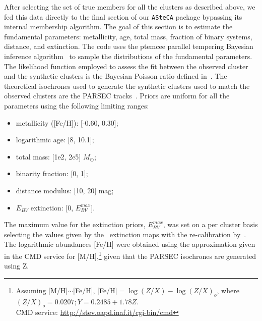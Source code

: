 \documentclass{aa}
\begin{document}
  After selecting the set of true members for all the clusters as described
  above, we fed this data directly to the final section of our 
  \texttt{ASteCA} package bypassing its internal membership algorithm. 
  The goal of this section is  to estimate
  the fundamental parameters: metallicity, age, total mass, fraction of binary
  systems, distance, and extinction. The code uses the ptemcee parallel
  tempering Bayesian inference algorithm~\citep{ptemcee} to sample the
  distributions of the fundamental parameters. The likelihood function employed
  to assess the fit between the observed cluster and the synthetic clusters is
  the Bayesian Poisson ratio defined in~\cite{Tremmel_2013}.
  The theoretical isochrones used to generate the
  synthetic clusters used to match the observed clusters are the PARSEC
  tracks~\citep{Bressan_2012}. Priors are uniform for all the parameters using
  the following limiting ranges: \begin{itemize}
   \item metallicity ([Fe/H]): [-0.60, 0.30];
   \item logarithmic age: [8, 10.1];
   \item total mass: [1e2, 2e5] $M_{\odot}$;
   \item binarity fraction: [0, 1];
   \item distance modulus: [10, 20] mag;
   \item $E_{BV}$ extinction: [0, $E_{BV}^{max}$].
  \end{itemize}

  \noindent The maximum value for the extinction priors, $E_{BV}^{max}$, was set
  on a per cluster basis selecting the values given by the~\cite{Schlegel_1998}
  extinction maps with the re-calibration by~\cite{Schlafly_2011}.
  The logarithmic abundances [Fe/H] were obtained using the approximation given
  in the CMD service for [M/H],\footnote{Assuming [M/H]$\sim$[Fe/H], [Fe/H]$=\log(Z/X)-\log(Z/X)_{o}$, where
  $(Z/X)_{o}=0.0207; Y=0.2485+1.78Z$.\\
  CMD service: \url{http://stev.oapd.inaf.it/cgi-bin/cmd}} given that the
  PARSEC isochrones are generated using Z.
\end{document}
